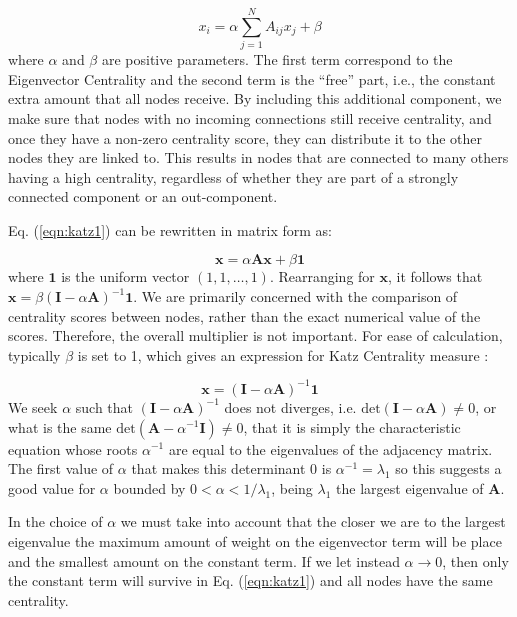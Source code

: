 \begin{equation}
\label{eqn:katz1}
    x_i= \alpha\sum_{j=1}^{N}A_{ij}x_j + \beta
\end{equation}
where $\alpha$ and $\beta$ are positive parameters. The first term correspond to the Eigenvector Centrality and the second term is the “free” part, i.e., the constant extra amount that all nodes receive. By including this additional component, we make sure that nodes with no incoming connections still receive centrality, and once they have a non-zero centrality score, they can distribute it to the other nodes they are linked to. This results in nodes that are connected to many others having a high centrality, regardless of whether they are part of a strongly connected component or an out-component.

Eq. (\ref{eqn:katz1}) can be rewritten in matrix form as:

\begin{equation}
\label{eqn:katz2}
    \mathbf{x}= \alpha\mathbf{Ax} + \beta\mathbf{1}
\end{equation}
where $\mathbf{1}$ is the uniform vector $(1,1,\dots,1)$. Rearranging for $\mathbf{x}$, it follows that $\mathbf{x} = \beta (\mathbf{I}-\alpha\mathbf{A})^{-1}\mathbf{1}$.
We are primarily concerned with the comparison of centrality scores between nodes, rather than the exact numerical value of the scores. Therefore, the overall multiplier is not important. For ease of calculation, typically $\beta$ is set to 1, which gives an expression for Katz Centrality measure \cite{katz1953new}:

\begin{equation}
\label{eqn:katz3}
    \mathbf{x} = (\mathbf{I}-\alpha\mathbf{A})^{-1}\mathbf{1}
\end{equation}
We seek $\alpha$ such that $(\mathbf{I}-\alpha\mathbf{A})^{-1}$ does not diverges, i.e. $\text{det}(\mathbf{I}-\alpha\mathbf{A})\neq 0$, or what is the same $\text{det}(\mathbf{A}-\alpha^{-1}\mathbf{I})\neq 0$, that it is simply the characteristic equation whose roots $\alpha^{-1}$ are equal to the eigenvalues of the adjacency matrix. The first value of $\alpha$ that makes this determinant $0$ is $\alpha^{-1}=\lambda_1$ so this suggests a good value for $\alpha$ bounded by $0 < \alpha < 1/\lambda_1 $, being $\lambda_1$ the largest eigenvalue of $\mathbf{A}$. 

In the choice of $\alpha$ we must take into account that the closer we are to the largest eigenvalue the maximum amount of weight on the eigenvector term will be place and the smallest amount on the constant term. If we let instead $\alpha\to 0$, then only the constant term will survive in Eq. (\ref{eqn:katz1}) and all nodes have the same centrality.

